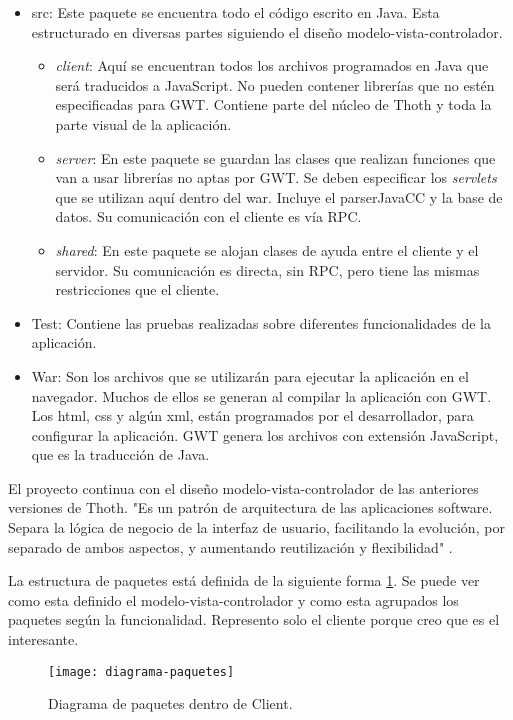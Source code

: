 \begin{itemize}
\item src:
Este paquete se encuentra todo el código escrito en Java. Esta estructurado en diversas partes siguiendo el diseño modelo-vista-controlador.
	\begin{itemize}
	\item \emph{client}: Aquí se encuentran todos los archivos programados en Java que será traducidos a JavaScript. No pueden contener librerías que no estén especificadas para GWT. Contiene parte del núcleo de Thoth y toda la parte visual de la aplicación.
	\item \emph{server}: En este paquete se guardan las clases que realizan funciones que van a usar librerías no aptas por GWT. Se deben especificar los \emph{servlets} que se utilizan aquí dentro del war. Incluye el parserJavaCC y la base de datos. Su comunicación con el cliente es vía RPC.
	\item \emph{shared}: En este paquete se alojan clases de ayuda entre el cliente y el servidor. Su comunicación es directa, sin RPC, pero tiene las mismas restricciones que el cliente.
	\end{itemize}
\item Test: Contiene las pruebas realizadas sobre diferentes funcionalidades de la aplicación.

\item War:
	Son los archivos que se utilizarán para ejecutar la aplicación en el navegador. Muchos de ellos se generan al compilar la aplicación con GWT. Los html, css y algún xml, están programados por el desarrollador, para configurar la aplicación. GWT genera los archivos con extensión JavaScript, que es la traducción de Java.
\end{itemize}


El proyecto continua con el diseño modelo-vista-controlador de las anteriores versiones de Thoth. 
"Es un patrón de arquitectura de las aplicaciones software. Separa la lógica de negocio de la interfaz de usuario, facilitando la evolución, por separado de ambos aspectos, y aumentando reutilización y flexibilidad" \cite{mvc}.

La estructura de paquetes está definida de la siguiente forma \ref{fig:4.8}. Se puede ver como esta definido el modelo-vista-controlador y como esta agrupados los paquetes según la funcionalidad. Represento solo el cliente porque creo que es el interesante.

\begin{figure}[h]
\centering
\texttt{[image: diagrama-paquetes]}
\caption{Diagrama de paquetes dentro de Client.}
\label{fig:4.8}
\end{figure}